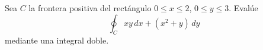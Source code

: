 Sea $C$ la frontera positiva del rectángulo $0\leq x\leq2$, $0\leq y\leq3$. Evalúe
\[
\oint_C xy\,dx+(x^2+y)\,dy
\]
mediante una integral doble.
